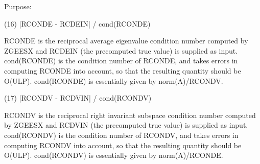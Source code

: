 \begin{DoxyParagraph}{Purpose\+: }
\begin{DoxyVerb}
   (16)  |RCONDE - RCDEIN| / cond(RCONDE)

      RCONDE is the reciprocal average eigenvalue condition number
      computed by ZGEESX and RCDEIN (the precomputed true value)
      is supplied as input.  cond(RCONDE) is the condition number
      of RCONDE, and takes errors in computing RCONDE into account,
      so that the resulting quantity should be O(ULP). cond(RCONDE)
      is essentially given by norm(A)/RCONDV.

   (17)  |RCONDV - RCDVIN| / cond(RCONDV)

      RCONDV is the reciprocal right invariant subspace condition
      number computed by ZGEESX and RCDVIN (the precomputed true
      value) is supplied as input. cond(RCONDV) is the condition
      number of RCONDV, and takes errors in computing RCONDV into
      account, so that the resulting quantity should be O(ULP).
      cond(RCONDV) is essentially given by norm(A)/RCONDE.\end{DoxyVerb}
 
\end{DoxyParagraph}

